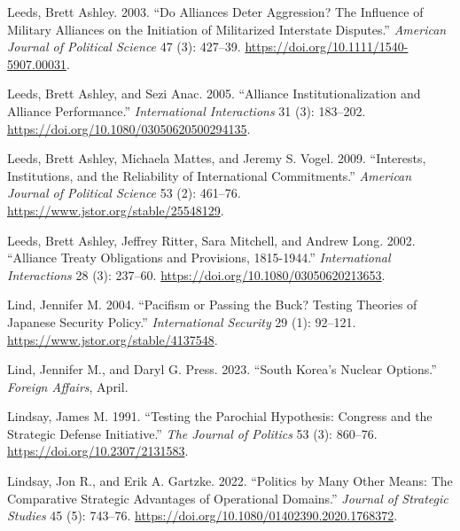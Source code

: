 \documentclass[
  12,
  letterpaper,
  DIV=11,
  numbers=noendperiod]{scrartcl}
\newlength{\cslhangindent}
\newlength{\cslentryspacingunit} %
\newenvironment{CSLReferences}[2] %
 {%
  \setlength{\parindent}{0pt}
  \ifodd #1
  \let\oldpar\par
  \def\par{\hangindent=\cslhangindent\oldpar}
  \fi
  \setlength{\parskip}{#2\cslentryspacingunit}
 }%
 {}
\begin{document}
\begin{CSLReferences}{1}{0}
\leavevmode{}%
Leeds, Brett Ashley. 2003. {``Do {Alliances Deter Aggression}? {The
Influence} of {Military Alliances} on the {Initiation} of {Militarized
Interstate Disputes}.''} \emph{American Journal of Political Science} 47
(3): 427--39. \url{https://doi.org/10.1111/1540-5907.00031}.

\leavevmode{}%
Leeds, Brett Ashley, and Sezi Anac. 2005. {``Alliance
{Institutionalization} and {Alliance Performance}.''}
\emph{International Interactions} 31 (3): 183--202.
\url{https://doi.org/10.1080/03050620500294135}.

\leavevmode{}%
Leeds, Brett Ashley, Michaela Mattes, and Jeremy S. Vogel. 2009.
{``Interests, {Institutions}, and the {Reliability} of {International
Commitments}.''} \emph{American Journal of Political Science} 53 (2):
461--76. \url{https://www.jstor.org/stable/25548129}.

\leavevmode{}%
Leeds, Brett Ashley, Jeffrey Ritter, Sara Mitchell, and Andrew Long.
2002. {``Alliance {Treaty Obligations} and {Provisions}, 1815-1944.''}
\emph{International Interactions} 28 (3): 237--60.
\url{https://doi.org/10.1080/03050620213653}.

\leavevmode{}%
Lind, Jennifer M. 2004. {``Pacifism or {Passing} the {Buck}? {Testing
Theories} of {Japanese Security Policy}.''} \emph{International
Security} 29 (1): 92--121. \url{https://www.jstor.org/stable/4137548}.

\leavevmode{}%
Lind, Jennifer M., and Daryl G. Press. 2023. {``South {Korea}'s {Nuclear
Options}.''} \emph{Foreign Affairs}, April.

\leavevmode{}%
Lindsay, James M. 1991. {``Testing the {Parochial Hypothesis}:
{Congress} and the {Strategic Defense Initiative}.''} \emph{The Journal
of Politics} 53 (3): 860--76. \url{https://doi.org/10.2307/2131583}.

\leavevmode{}%
Lindsay, Jon R., and Erik A. Gartzke. 2022. {``Politics by Many Other
Means: {The} Comparative Strategic Advantages of Operational Domains.''}
\emph{Journal of Strategic Studies} 45 (5): 743--76.
\url{https://doi.org/10.1080/01402390.2020.1768372}.


\end{CSLReferences}
\end{document}
